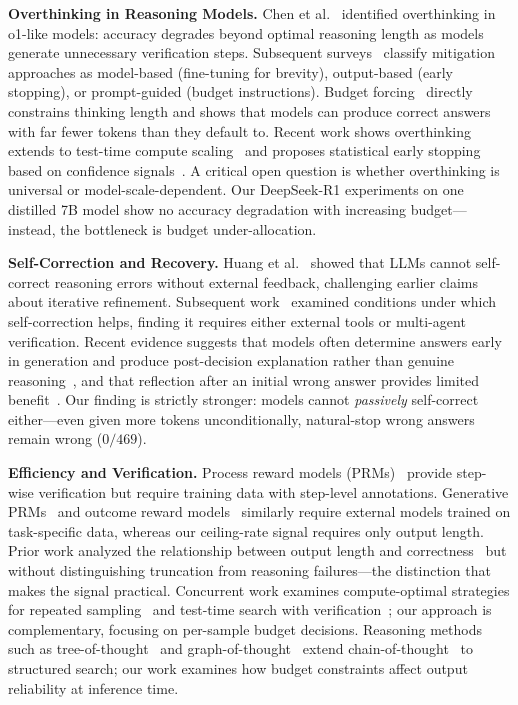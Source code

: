 \documentclass{article}
\begin{document}
\textbf{Overthinking in Reasoning Models.}
Chen et al.~\cite{chen2024overthinking} identified overthinking in o1-like models: accuracy degrades beyond optimal reasoning length as models generate unnecessary verification steps. Subsequent surveys~\cite{stoptoverthinking2025survey} classify mitigation approaches as model-based (fine-tuning for brevity), output-based (early stopping), or prompt-guided (budget instructions). Budget forcing~\cite{muennighoff2025s1} directly constrains thinking length and shows that models can produce correct answers with far fewer tokens than they default to. Recent work shows overthinking extends to test-time compute scaling~\cite{morethinkinghurts2026} and proposes statistical early stopping based on confidence signals~\cite{statstop2026}. A critical open question is whether overthinking is universal or model-scale-dependent. Our DeepSeek-R1 experiments on one distilled 7B model show no accuracy degradation with increasing budget---instead, the bottleneck is budget under-allocation.

\textbf{Self-Correction and Recovery.}
Huang et al.~\cite{huang2023selfcorrect} showed that LLMs cannot self-correct reasoning errors without external feedback, challenging earlier claims about iterative refinement. Subsequent work~\cite{tyen2024llms,madaan2023self} examined conditions under which self-correction helps, finding it requires either external tools or multi-agent verification. Recent evidence suggests that models often determine answers early in generation and produce post-decision explanation rather than genuine reasoning~\cite{decideearly2026}, and that reflection after an initial wrong answer provides limited benefit~\cite{firsttry2025}. Our finding is strictly stronger: models cannot \emph{passively} self-correct either---even given more tokens unconditionally, natural-stop wrong answers remain wrong ($0/469$).

\textbf{Efficiency and Verification.}
Process reward models (PRMs)~\cite{lightman2023process} provide step-wise verification but require training data with step-level annotations. Generative PRMs~\cite{genprm2024} and outcome reward models~\cite{cobbe2021gsm8k,zhang2025generative} similarly require external models trained on task-specific data, whereas our ceiling-rate signal requires only output length. Prior work analyzed the relationship between output length and correctness~\cite{concisethoughts2024} but without distinguishing truncation from reasoning failures---the distinction that makes the signal practical. Concurrent work examines compute-optimal strategies for repeated sampling~\cite{qiu2024treebon} and test-time search with verification~\cite{setlur2025scaling}; our approach is complementary, focusing on per-sample budget decisions. Reasoning methods such as tree-of-thought~\cite{yao2024tree} and graph-of-thought~\cite{besta2024graph} extend chain-of-thought~\cite{wei2022chain} to structured search; our work examines how budget constraints affect output reliability at inference time.
\end{document}
